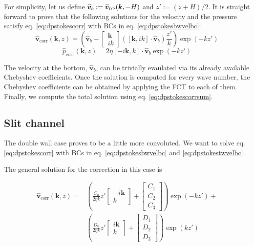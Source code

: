 \documentclass[ twoside,openright,titlepage,numbers=noenddot,%
headinclude,footinclude,cleardoublepage=empty,abstract=on,
BCOR=5mm,paper=a4,fontsize=11pt, dvipsnames
]{scrreprt}
\renewcommand{\vec}[1]{\bm{#1}}
\newcommand{\fou}[1]{\widehat{#1}}
\newcommand{\fvel}{v}
\newcommand{\corr}{\text{corr}}
\newcommand{\dpr}{\text{\tiny DP}}
\begin{document}
For simplicity, let us define $\fou{\vec{\fvel}}_b := \fou{\vec{\fvel}}_{\dpr}(\vec{k}, -H)$ and $z':=(z+H)/2$.
It is straight forward to prove that the following solutions for the velocity and the pressure satisfy eq. \eqref{eq:dpstokescorr} with \glspl{BC} in eq. \eqref{eq:dpstokesbwvelbc}:
\begin{equation}
  \fou{\vec{\fvel}}_{\corr}(\vec{k}, z) = \left(  \fou{\vec{\fvel}}_b -
    \begin{bmatrix}
    \vec{k}\\
    ik
  \end{bmatrix}
  \left(\left[\vec{k},ik\right]\cdot\fou{\vec{\fvel}}_b\right) \frac{z'}{k}\right)\exp\left(-kz'\right)
\end{equation}
\begin{equation}
  \fou{p}_{\corr}(\vec{k}, z) = 2\eta \left[-i\vec{k},k\right]\cdot\fou{\vec{\fvel}}_b\exp\left(-kz'\right)
\end{equation}

The velocity at the bottom, $\fou{\vec{\fvel}}_b$, can be trivially evaulated via its already available Chebyshev coefficients. Once the solution is computed for every wave number, the Chebyshev coefficients can be obtained by applying the \gls{FCT} to each of them. Finally, we compute the total solution using eq. \eqref{eq:dpstokescorrsum}.

\subsection*{Slit channel}
The double wall case proves to be a little more convoluted. We want to solve eq. \eqref{eq:dpstokescorr} with \glspl{BC} in eq. \eqref{eq:dpstokesbwvelbc} and \eqref{eq:dpstokestwvelbc}.

The general solution for the correction in this case is

\begin{equation}
  \label{eq:dpstokesslitcor}
  \begin{aligned}
    \fou{\vec{\fvel}}_{\corr}(\vec{k}, z) =& \left(\frac{C_0}{2\eta k} z'
      \begin{bmatrix}
        -i\vec{k}\\
        k
      \end{bmatrix}
      +
      \begin{bmatrix}
        C_1\\
        C_2\\
        C_3
      \end{bmatrix}
    \right)
    \exp(-kz')+\\    
    &\left(\frac{D_0}{2\eta k} z'
      \begin{bmatrix}
        i\vec{k}\\
        k
      \end{bmatrix}
      +
      \begin{bmatrix}
        D_1\\
        D_2\\
        D_3
      \end{bmatrix}
    \right)\exp(kz')
  \end{aligned}
\end{equation}
\end{document}
